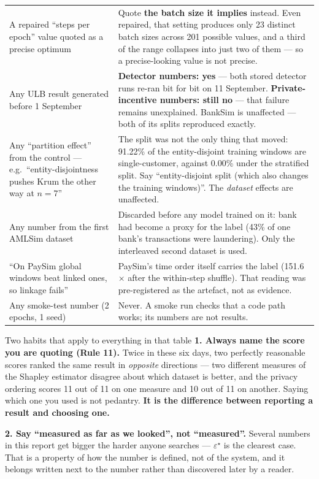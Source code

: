 \documentclass[11pt]{article}
\newcommand{\epsst}{\ensuremath{\varepsilon^{\star}}}
\newcommand{\x}{\ensuremath{\times}}
\begin{document}
\begin{center}
\begin{tabularx}{\linewidth}{@{}p{5.6cm} X@{}}
A repaired ``steps per epoch'' value quoted as a precise optimum & Quote \textbf{the batch size it implies} instead. Even repaired, that setting produces only 23 distinct batch sizes across 201 possible values, and a third of the range collapses into just two of them --- so a precise-looking value is not precise. \\
Any ULB result generated before 1 September & \textbf{Detector numbers: yes} --- both stored detector runs re-ran bit for bit on 11 September. \textbf{Private-incentive numbers: still no} --- that failure remains unexplained. BankSim is unaffected --- both of its splits reproduced exactly. \\
Any ``partition effect'' from the control --- e.g.\ ``entity-disjointness pushes Krum the other way at $n=7$'' & The split was not the only thing that moved: 91.22\% of the entity-disjoint training windows are single-customer, against 0.00\% under the stratified split. Say ``entity-disjoint split (which also changes the training windows)''. The \emph{dataset} effects are unaffected. \\
Any number from the first AMLSim dataset & Discarded before any model trained on it: bank had become a proxy for the label (43\% of one bank's transactions were laundering). Only the interleaved second dataset is used. \\
``On PaySim global windows beat linked ones, so linkage fails'' & PaySim's time order itself carries the label (151.6\x{} after the within-step shuffle). That reading was pre-registered as the artefact, not as evidence. \\
Any smoke-test number (2 epochs, 1 seed) & Never. A smoke run checks that a code path works; its numbers are not results. \\
\bottomrule
\end{tabularx}
\end{center}

\begin{keybox}{Two habits that apply to everything in that table}
\textbf{1. Always name the score you are quoting (Rule 11).} Twice in these six days, two perfectly
reasonable scores ranked the same result in \emph{opposite} directions --- two different measures of the
Shapley estimator disagree about which dataset is better, and the privacy ordering scores 11 out of 11
on one measure and 10 out of 11 on another. Saying which one you used is not pedantry. \textbf{It is the
difference between reporting a result and choosing one.}

\textbf{2. Say ``measured as far as we looked'', not ``measured''.} Several numbers in this report get
bigger the harder anyone searches --- \epsst{} is the clearest case. That is a property of how the
number is defined, not of the system, and it belongs written next to the number rather than discovered
later by a reader.
\end{keybox}
\end{document}
